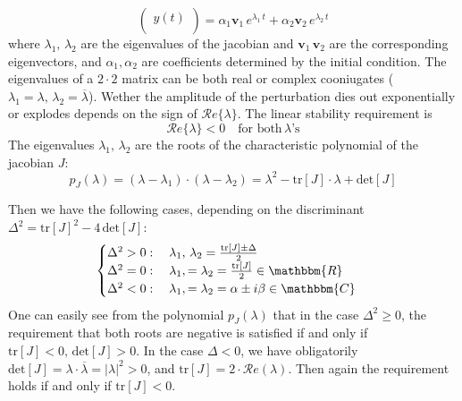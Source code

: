 {\begin{equation*}
\begin{pmatrix}
        y(t) \\
    \end{pmatrix}
     = 
     \alpha_1 \mathbf{v}_1\, e^{\lambda_1\, t} + \alpha_2 \mathbf{v}_2\, e^{\lambda_2\, t} 
\end{equation*}
where $\lambda_1,\, \lambda_2$ are the eigenvalues of the jacobian and $\mathbf{v}_1\, \mathbf{v}_2$ are the corresponding eigenvectors, and $\alpha_1, \alpha_2$ are coefficients determined by the initial condition. The eigenvalues of a $2\cdot 2$ matrix can be both real or complex cooniugates ($\lambda_1 = \lambda, \, \lambda_2 = \overline{\lambda}$). Wether the amplitude of the perturbation dies out exponentially or explodes depends on the sign of $\mathcal{R}e\{\lambda\}$. The linear stability requirement is
$$
\mathcal{R}e\{\lambda\} <0 \quad \text{for both} \, \lambda\text{'s}
$$
The eigenvalues $\lambda_1,\, \lambda_2$ are the roots of the characteristic polynomial of the jacobian $J$:
\begin{equation*}
    p_J(\lambda) = (\lambda - \lambda_1)\cdot (\lambda - \lambda_2) = \lambda^2 - \text{tr}[J]\cdot\lambda + \text{det}[J]
\end{equation*}
\begin{minipage}{0.4\textwidth}
Then we have the following cases, depending on the discriminant $\Delta^2 = \text{tr}[J]^2 - 4\,\text{det}[J]$:
\begin{equation*}
    \begin{cases}
        \Delta^2 > 0: \quad \lambda_1,\, \lambda_2  =  \frac{\text{tr}[J] \pm \Delta }{2} \\
        \Delta^2 = 0: \quad \lambda_1,= \lambda_2 = \frac{\text{tr}[J]}{2} \in \mathbbm{R} \\
        \Delta^2 <0: \quad \lambda_1,= \lambda_2  = \alpha \pm i \beta \in \mathbbm{C}
    \end{cases}
\end{equation*}
One can easily see from the polynomial $p_J(\lambda)$ that in the case $\Delta^2 \geq 0$, the requirement that both roots are negative is satisfied if and only if $\text{tr}[J]<0,\, \text{det}[J] >0$. In the case $\Delta <0$, we have obligatorily $\text{det}[J] = \lambda \cdot \overline{\lambda} = |\lambda|^2 >0$, and $\text{tr}[J]= 2\cdot \mathcal{R}e(\lambda)$. Then again the requirement holds if and only if $\text{tr}[J]< 0$.
\end{minipage}
\hfill
\begin{minipage}{0.5\textwidth}
\centering

\end{minipage}}
